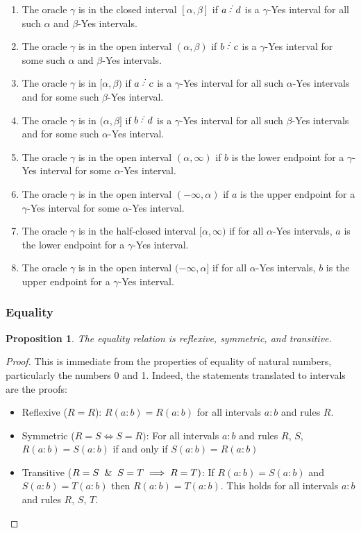 \documentclass[12pt]{article}
\newtheorem{proposition}{Proposition}[subsection]
\begin{document}
\begin{enumerate}
\item The oracle $\gamma$ is in the closed interval $[\alpha, \beta]$ if $a \lte  d$ is a $\gamma$-Yes interval for all such $\alpha$ and $\beta$-Yes intervals. 
\item The oracle $\gamma$ is in the open interval $(\alpha, \beta)$ if $b\lte c$ is a $\gamma$-Yes interval for some such $\alpha$ and $\beta$-Yes intervals. 
\item The oracle $\gamma$ is in $[\alpha, \beta)$ if $a\lte c$ is a $\gamma$-Yes interval for all such $\alpha$-Yes intervals and for some such $\beta$-Yes interval.
\item The oracle $\gamma$ is in $(\alpha, \beta]$ if $b\lte d$ is a $\gamma$-Yes interval for all such $\beta$-Yes intervals and for some such $\alpha$-Yes interval.
\item The oracle $\gamma$ is in the open interval $(\alpha, \infty)$ if $b$ is the lower endpoint for a $\gamma$-Yes interval for some $\alpha$-Yes interval. 
\item The oracle $\gamma$ is in the open interval $(-\infty, \alpha)$ if $a$ is the upper endpoint for a $\gamma$-Yes interval for some $\alpha$-Yes interval. 
\item The oracle $\gamma$ is in the half-closed interval $[\alpha, \infty)$ if for all $\alpha$-Yes intervals, $a$ is the lower endpoint for a $\gamma$-Yes interval. 
\item The oracle $\gamma$ is in the open interval $(-\infty, \alpha]$ if for all $\alpha$-Yes intervals, $b$ is the upper endpoint for a $\gamma$-Yes interval. 
\end{enumerate}



\subsubsection{Equality}\label{sec:eq}

\begin{proposition}\label{pr:reflexive}
The equality relation is reflexive, symmetric, and transitive. 
\end{proposition}

\begin{proof}
This is immediate from the properties of equality of natural numbers, particularly the numbers 0 and 1. Indeed, the statements translated to intervals are the proofs:
\begin{itemize}
    \item Reflexive ($R=R$): $R(a:b)=R(a:b)$ for all intervals $a:b$ and rules $R$.
    \item Symmetric ($R=S \iff S=R)$: For all intervals $a:b$ and rules $R$, $S$, $R(a:b)=S(a:b)$ if and only if $S(a:b) = R(a:b)$ 
    \item Transitive ($R=S \And S=T \implies R=T)$: If $R(a:b)=S(a:b)$ and $S(a:b) = T(a:b)$ then $R(a:b)=T(a:b)$. This holds for all intervals $a:b$ and rules $R$, $S$, $T$.
\end{itemize}
\end{proof}
\end{document}
